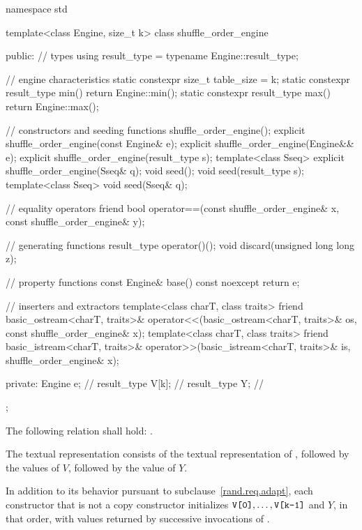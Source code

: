 %
%
\begin{codeblock}
namespace std {
  template<class Engine, size_t k>
  class shuffle_order_engine {
  public:
    // types
    using result_type = typename Engine::result_type;

    // engine characteristics
    static constexpr size_t table_size = k;
    static constexpr result_type min() { return Engine::min(); }
    static constexpr result_type max() { return Engine::max(); }

    // constructors and seeding functions
    shuffle_order_engine();
    explicit shuffle_order_engine(const Engine& e);
    explicit shuffle_order_engine(Engine&& e);
    explicit shuffle_order_engine(result_type s);
    template<class Sseq> explicit shuffle_order_engine(Sseq& q);
    void seed();
    void seed(result_type s);
    template<class Sseq> void seed(Sseq& q);

    // equality operators
    friend bool operator==(const shuffle_order_engine& x, const shuffle_order_engine& y);

    // generating functions
    result_type operator()();
    void discard(unsigned long long z);

    // property functions
    const Engine& base() const noexcept { return e; }

    // inserters and extractors
    template<class charT, class traits>
      friend basic_ostream<charT, traits>&
        operator<<(basic_ostream<charT, traits>& os, const shuffle_order_engine& x);
    template<class charT, class traits>
      friend basic_istream<charT, traits>&
        operator>>(basic_istream<charT, traits>& is, shuffle_order_engine& x);

  private:
    Engine e;           // \expos
    result_type V[k];   // \expos
    result_type Y;      // \expos
  };
}
\end{codeblock}

\pnum
The following relation shall hold:
  .

\pnum
The textual representation
consists of
 the textual representation of ,
followed by
 the  values of $V$,
followed by
 the value of $Y$.

\pnum
In addition to its behavior
pursuant to subclause~\ref{rand.req.adapt},
each constructor%
that is not a copy constructor
initializes $\texttt{\protect V[0]}, \dotsc, \texttt{\protect V[k-1]}$ and $Y$,
in that order,
with values returned by successive invocations of .%



